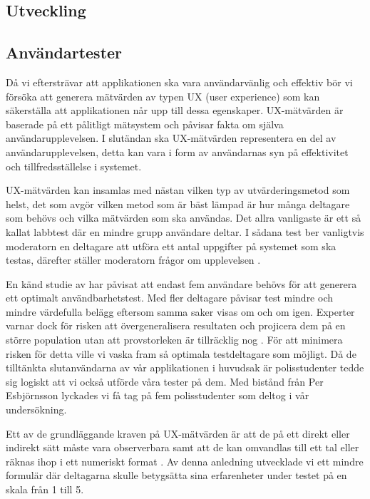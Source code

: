\documentclass[swedish]{maucsthesis}
\begin{document}
\subsection{Utveckling}


\subsection{Användartester}

Då vi eftersträvar att applikationen ska vara användarvänlig och effektiv bör vi
försöka att generera mätvärden av typen UX (user experience) som kan säkerställa
att applikationen når upp till dessa egenskaper. UX-mätvärden är baserade på ett
pålitligt mätsystem och påvisar fakta om själva användarupplevelsen. I slutändan
ska UX-mätvärden representera en del av användarupplevelsen, detta kan vara i
form av användarnas syn på effektivitet och tillfredsställelse i systemet.

UX-mätvärden kan insamlas med nästan vilken typ av utvärderingsmetod som helst,
det som avgör vilken metod som är bäst lämpad är hur många deltagare som behövs
och vilka mätvärden som ska användas. Det allra vanligaste är ett så kallat
labbtest där en mindre grupp användare deltar. I sådana test ber vanligtvis
moderatorn en deltagare att utföra ett antal uppgifter på systemet som ska
testas, därefter ställer moderatorn frågor om upplevelsen \citep{tullis:2013}.

En känd studie av \citep{nielsen:2000} har påvisat att endast fem användare
behövs för att generera ett optimalt användbarhetstest. Med fler deltagare
påvisar test mindre och mindre värdefulla belägg eftersom samma saker visas om
och om igen. Experter varnar dock för risken att övergeneralisera resultaten och
projicera dem på en större population utan att provstorleken är tillräcklig nog
\citep{tullis:2013}. För att minimera risken för detta ville vi vaska fram så
optimala testdeltagare som möjligt. Då de tilltänkta slutanvändarna av vår
applikationen i huvudsak är polisstudenter tedde sig logiskt att vi också
utförde våra tester på dem. Med bistånd från Per Esbjörnsson lyckades vi få tag
på fem polisstudenter som deltog i vår undersökning.

Ett av de grundläggande kraven på UX-mätvärden är att de på ett direkt eller
indirekt sätt måste vara observerbara samt att de kan omvandlas till ett tal
eller räknas ihop i ett numeriskt format \citep{tullis:2013}. Av denna anledning
utvecklade vi ett mindre formulär där deltagarna skulle betygsätta sina
erfarenheter under testet på en skala från 1 till 5.
\end{document}
